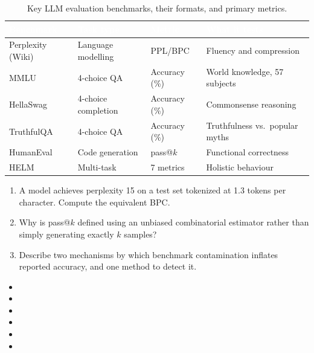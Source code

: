 \documentclass[11pt,a4paper]{article}
\begin{document}
	\begin{table}[ht]
		\centering
		\small\sffamily
		\renewcommand{\arraystretch}{1.3}
		\begin{tabular}{@{}L{3cm} L{3.5cm} L{2.5cm} L{4.5cm}@{}}
			\toprule
			\textcolor{white}{\textbf{Benchmark}} &
			\textcolor{white}{\textbf{Task type}} &
			\textcolor{white}{\textbf{Metric}} &
			\textcolor{white}{\textbf{What it tests}} \\
			\midrule
			Perplexity (Wiki) & Language modelling & PPL/BPC       & Fluency and compression \\
			MMLU              & 4-choice QA        & Accuracy (\%) & World knowledge, 57 subjects \\
			HellaSwag         & 4-choice completion & Accuracy (\%) & Commonsense reasoning \\
			TruthfulQA        & 4-choice QA        & Accuracy (\%) & Truthfulness vs.\ popular myths \\
			HumanEval         & Code generation    & pass@$k$      & Functional correctness \\
			HELM              & Multi-task         & 7 metrics     & Holistic behaviour \\
			\bottomrule
		\end{tabular}
		\caption{Key LLM evaluation benchmarks, their formats, and primary metrics.}
		\label{tab:eval_benchmarks}
	\end{table}

	\begin{checkpoint}
		\begin{enumerate}
			\item A model achieves perplexity 15 on a test set tokenized at 1.3 tokens per character. Compute the equivalent BPC.
			\item Why is pass@$k$ defined using an unbiased combinatorial estimator rather than simply generating exactly $k$ samples?
			\item Describe two mechanisms by which benchmark contamination inflates reported accuracy, and one method to detect it.
		\end{enumerate}
	\end{checkpoint}

	\begin{sourcesbox}
		\small
		\begin{itemize}[nosep]
			\item {}
			\item {}
			\item {}
			\item {}
			\item {}
			\item {}
		\end{itemize}
	\end{sourcesbox}
\end{document}
